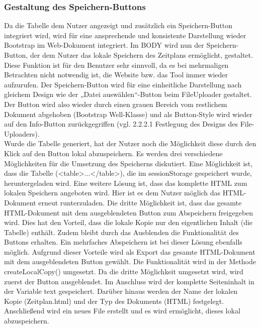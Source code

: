 \subsubsection{Gestaltung des Speichern-Buttons}
Da die Tabelle dem Nutzer angezeigt und zusätzlich ein Speichern-Button integriert wird, wird für eine ansprechende und konsistente Darstellung wieder Bootstrap im Web-Dokument integriert. Im BODY wird nun der Speichern-Button, der dem Nutzer das lokale Speichern des Zeitplans ermöglicht, gestaltet. Diese Funktion ist für den Benutzer sehr sinnvoll, da es bei mehrmaligen Betrachten nicht notwendig ist, die Website bzw. das Tool immer wieder aufzurufen. Der Speichern-Button wird für eine einheitliche Darstellung nach gleichem Design wie der „Datei auswählen“-Button beim FileUploader gestaltet. Der Button wird also wieder durch einen grauen Bereich vom restlichem Dokument abgehoben (Bootstrap Well-Klasse) und als Button-Style wird wieder auf den Info-Button zurückgegriffen (vgl. 2.2.2.1 Festlegung des Designs des File-Uploaders).\\
Wurde die Tabelle generiert, hat der Nutzer noch die Möglichkeit diese durch den Klick auf den Button lokal abzuspeichern. Es werden drei verschiedene Möglichkeiten für die Umsetzung des Speicherns diskutiert. Eine Möglichkeit ist, dass die Tabelle (<table>...</table>), die im sessionStorage gespeichert wurde, heruntergeladen wird. Eine weitere Lösung ist, dass das komplette HTML zum lokalen Speichern angeboten wird. Hier ist es dem Nutzer möglich das HTML-Dokument erneut runterzuladen. Die dritte Möglichkeit ist, dass das gesamte HTML-Dokument mit dem ausgeblendeten Button zum Abspeichern freigegeben wird. Dies hat den Vorteil, dass die lokale Kopie nur den eigentlichen Inhalt (die Tabelle) enthält. Zudem bleibt durch das Ausblenden die Funktionalität des Buttons erhalten. Ein mehrfaches Abspeichern ist bei dieser Lösung ebenfalls möglich. Aufgrund dieser Vorteile wird als Export das gesamte HTML-Dokument mit dem ausgeblendeten Button gewählt. 
Die Funktionalität wird in der Methode createLocalCopy() umgesetzt. Da die dritte Möglichkeit umgesetzt wird, wird zuerst der Button ausgeblendet. Im Anschluss wird der komplette Seiteninhalt in der Variable text gespeichert. Darüber hinaus werden der Name der lokalen Kopie (Zeitplan.html) und der Typ des Dokuments (HTML) festgelegt. Anschließend wird ein neues File erstellt und es wird ermöglicht, dieses lokal abzuspeichern.

